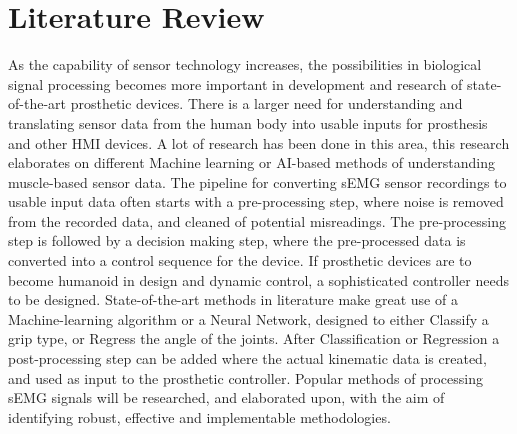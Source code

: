 \documentclass[../main.tex]{subfiles}
\begin{document}
\section{Literature Review}
\label{sec:literature}

As the capability of sensor technology increases, the possibilities in biological signal processing becomes more important in development and research of state-of-the-art prosthetic devices.
There is a larger need for understanding and translating sensor data from the human body into usable inputs for prosthesis and other \gls{HMI} devices.
A lot of research has been done in this area, this research elaborates on different Machine learning or AI-based methods of understanding muscle-based sensor data.
The pipeline for converting sEMG sensor recordings to usable input data often starts with a pre-processing step, where noise is removed from the recorded data, and cleaned of potential misreadings.
The pre-processing step is followed by a decision making step, where the pre-processed data is converted into a control sequence for the device.
If prosthetic devices are to become humanoid in design and dynamic control, a sophisticated controller needs to be designed.
State-of-the-art methods in literature make great use of a Machine-learning algorithm or a Neural Network, designed to either Classify a grip type, or Regress the angle of the joints.
After Classification or Regression a post-processing step can be added where the actual kinematic data is created, and used as input to the prosthetic controller. 
Popular methods of processing sEMG signals will be researched, and elaborated upon, with the aim of identifying robust, effective and implementable methodologies.


\end{document}
